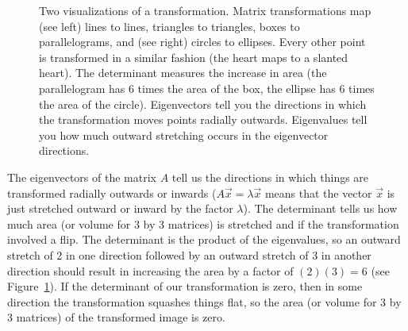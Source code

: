 \begin{figure}
\caption{{
Two visualizations of a transformation. 
	Matrix transformations map (see left) lines to lines, triangles to triangles, boxes to parallelograms, and (see right) circles to ellipses.		
	Every other point is transformed in a similar fashion (the heart maps to a slanted heart). 
	The determinant measures the increase in area (the parallelogram has 6 times the area of the box, the ellipse has 6 times the area of the circle).	
	Eigenvectors tell you the directions in which the transformation moves points radially outwards. 
	Eigenvalues tell you how much outward stretching occurs in the eigenvector directions. 
}}
\label{matrix transformation example}
\end{figure}

The eigenvectors of the matrix $A$ tell us the directions in which things are transformed radially outwards or inwards ($A\vec x = \lambda \vec x$ means that the vector $\vec x$ is just stretched outward or inward by the factor $\lambda$).  The determinant tells us how much area (or volume for 3 by 3 matrices) is stretched and if the transformation involved a flip.  The determinant is the product of the eigenvalues, so an outward stretch of 2 in one direction followed by an outward stretch of 3 in another direction should result in increasing the area by a factor of $(2)(3)=6$ (see Figure~\ref{matrix transformation example}).  If the determinant of our transformation is zero, then in some direction the transformation squashes things flat, so the area (or volume for 3 by 3 matrices) of the transformed image is zero.

